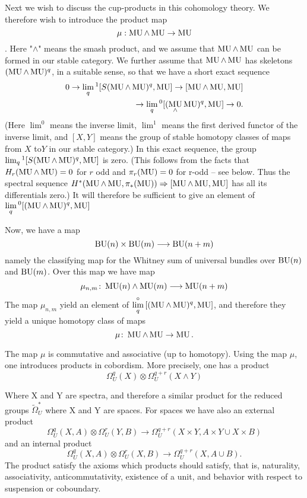 \documentclass[../main]{subfiles}
\begin{document}
Next we wish to discuss the cup-products in this cohomology theory. We therefore wish to introduce the product map
$$\mu: \mathop{\mathrm{MU}} \wedge \mathop{\mathrm{MU}} \rightarrow \mathop{\mathrm{MU}}$$.
Here "$\wedge$" means the smash product, and we assume that $\mathop{\mathrm{MU}} \wedge \mathop{\mathrm{MU}}$ can be formed in our stable category. We further assume that $\mathop{\mathrm{MU}} \wedge \mathop{\mathrm{MU}}$ has skeletons $(\mathop{\mathrm{MU}}\wedge \mathop{\mathrm{MU}})^q$, in a suitable sense, so that we have a short exact sequence 
\begin{equation*}
\begin{aligned}
0 \rightarrow \displaystyle\lim_{q} {}^1 [S(\mathop{\mathrm{MU}}\wedge \mathop{\mathrm{MU}})^q, \mathop{\mathrm{MU}}] \rightarrow [\mathop{\mathrm{MU}}\wedge \mathop{\mathrm{MU}}, \mathop{\mathrm{MU}}] \\ \rightarrow \displaystyle\lim_{q} {}^0 [(\mathop{\mathrm{MU}}_\wedge \mathop{\mathrm{MU}})^q, \mathop{\mathrm{MU}}]  \rightarrow 0.
\end{aligned}
\end{equation*}
(Here $\lim^0$ means the inverse limit, $\lim^1$ means the first derived functor of the inverse limit, and $[X, Y]$ means the group of stable homotopy classes of maps from $X$ to$Y$ in our stable category.) In this exact sequence, the group $\lim_q  {}^1 [S(\mathop{\mathrm{MU}} \wedge \mathop{\mathrm{MU}})^q, \mathop{\mathrm{MU}}]$ is zero. (This follows  from the facts that $H_r (\mathop{\mathrm{MU}} \wedge \mathop{\mathrm{MU}}) = 0$ for $r$ odd and $\pi_r (\mathop{\mathrm{MU}})=0$ for r-odd -- see below. Thus the spectral sequence $H^{*} (\mathop{\mathrm{MU}} \wedge \mathop{\mathrm{MU}}, \pi_{*} (\mathop{\mathrm{MU}})) \Rightarrow [\mathop{\mathrm{MU}} \wedge \mathop{\mathrm{MU}}, \mathop{\mathrm{MU}}]$ has all its differentials zero.) It will therefore be sufficient to give an element of $\displaystyle\lim_q {}^{0} [(\mathop{\mathrm{MU}} \wedge \mathop{\mathrm{MU}})^q, \mathop{\mathrm{MU}}]$ 

Now, we have a map
\[\mathop{\mathrm{BU}}(n)\times \mathop{\mathrm{BU}}(m) \longrightarrow \mathop{\mathrm{BU}}(n+m)\]
namely the classifying map for the Whitney sum of universal bundles over $\mathop{\mathrm{BU}}(n)$ and $\mathop{\mathrm{BU}}(m)$. Over this map we have map
\[\mu_{n, m}\colon \mathop{\mathrm{MU}}(n)\wedge \mathop{\mathrm{MU}}(m) \longrightarrow \mathop{\mathrm{MU}}(n+m)\]
The map $\mu_{n,m}$ yield an element of $\displaystyle{\lim_{q}^{\circ}} \left[ (\mathop{\mathrm{MU}} \wedge \mathop{\mathrm{MU}})^q, \mathop{\mathrm{MU}} \right]$, and therefore they yield a unique homotopy class of maps
\[
  \mu\colon  \mathop{\mathrm{MU}} \wedge \mathop{\mathrm{MU}} \to  \mathop{\mathrm{MU}}.  
\]

The map $\mu$ is commutative and associative (up to homotopy).
Using the map $\mu$, one introduces products in cobordism. More precisely, one has a product
\[
\Omega_{U}^q(X) \otimes \Omega_{U}^{q+r} (X \wedge Y)
\]

Where X and Y are spectra, and therefore a similar product for the reduced groups $\tilde{\Omega}^{\ast}_{U}$ where X and Y are spaces. For spaces we have also an external product 
\[
  \Omega^{q}_{U}(X,A) \otimes \Omega^{r}_{U}(Y,B) \to \Omega^{q+r}_{U}(X \times Y, A \times Y \cup X \times B)
\]
and an internal product
\[
  \Omega^{q}_{U}(X,A) \otimes \Omega^{r}_{U}(X,B) \to \Omega^{q+r}_{U}(X, A \cup  B ).
\]
The product satisfy the axioms which products should satisfy, that is, naturality, associativity, anticommutativity, existence of a unit, and behavior with respect to suspension or coboundary.
\end{document}
